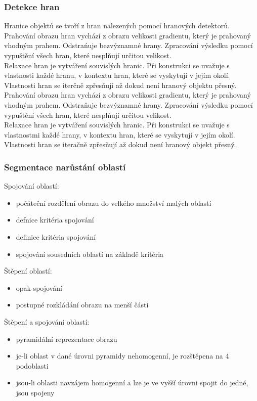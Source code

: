 \subsubsection{Detekce hran}
Hranice objektů se tvoří z hran nalezených pomocí hranových detektorů.\\
Prahování obrazu hran vychází z obrazu velikosti gradientu, který je prahovaný vhodným prahem. Odstrańuje bezvýznamné hrany. Zpracování výsledku pomocí vypuštění všech hran, které nesplňují určitou velikost.\\
Relaxace hran je vytváření souvislých hranic. Při konstrukci se uvažuje s vlastnosti každé hranu, v kontextu hran, které se vyskytují v jejím okolí. Vlastnosti hran se iterčně zpřesňují až dokud není hranový objektu přesný.\\
Prahování obrazu hran vychází z obrazu velikosti gradientu, který je prahovaný vhodným prahem. Odstraňuje bezvýznamné hrany. Zpracování výsledku pomocí vypuštění všech hran, které nesplňují určitou velikost.\\
Relaxace hran je vytváření souvislých hranic. Při konstrukci se uvažuje s vlastnostmi každé hrany, v kontextu hran, které se vyskytují v jejím okolí. Vlastnosti hran se iteračně zpřesňují až dokud není hranový objekt přesný.\\

\subsubsection{Segmentace narůstání oblastí}
Spojování oblastí:
\begin{itemize}
    \item počáteční rozdělení obrazu do velkého množství malých oblastí
    \item defnice kritéria spojování
    \item definice kritéria spojování
    \item spojování sousedních oblastí na základě kritéria
\end{itemize}
Štěpení oblastí:
\begin{itemize}
    \item opak spojování
    \item postupné rozkládání obrazu na menší části
\end{itemize}
Štěpení a spojování oblastí:
\begin{itemize}
    \item pyramidální reprezentace obrazu
    \item je-li oblast v dané úrovni pyramidy nehomogenní, je rozštěpena na 4 podoblasti
    \item jsou-li oblasti navzájem homogenní a lze je ve vyšší úrovni spojit do jedné, jsou spojeny
\end{itemize}

